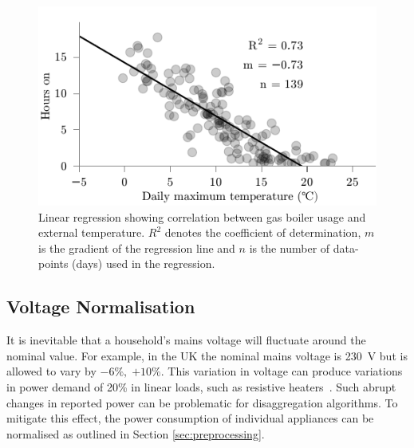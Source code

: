 \documentclass{sig-alternate}
\begin{document}
\begin{figure}[!t]
  \centering
  \includegraphics[width=\columnwidth]{figures/weather_correlations2.pdf} 
  \caption{Linear regression showing correlation between gas boiler
    usage and external temperature. $R^2$ denotes the coefficient of
    determination, $m$ is the gradient of the regression line and $n$
    is the number of data-points (days) used in the regression.}
  \label{fig:weather_correlations} 
\end{figure}

\subsection{Voltage Normalisation}

\noindent
It is inevitable that a household's mains voltage will fluctuate around the nominal value. For example, in the UK the nominal mains voltage is 230~V but is allowed to vary by
$-6\%,\;{+10}\%$.  This variation in voltage can produce variations in power demand of 20\% in linear loads, such as resistive heaters~\cite{hart_1992}.
Such abrupt changes in reported power can be
problematic for disaggregation algorithms.  To mitigate this effect, the power consumption of individual appliances can be normalised as outlined in Section \ref{sec:preprocessing}.
\end{document}

